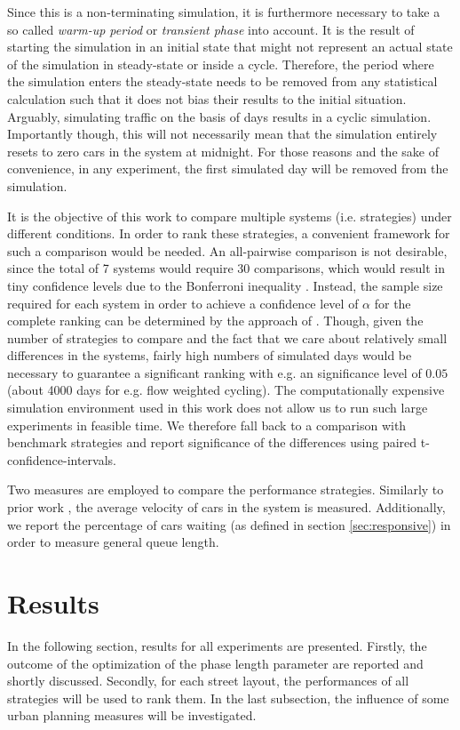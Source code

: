 \documentclass[11pt]{article}
\begin{document}
Since this is a non-terminating simulation, it is furthermore necessary to take a so called \textit{warm-up period} or \textit{transient phase} into account. It is the result of starting the simulation in an initial state that might not represent an actual state of the simulation in steady-state or inside a cycle. Therefore, the period where the simulation enters the steady-state needs to be removed from any statistical calculation such that it does not bias their results to the initial situation. Arguably, simulating traffic on the basis of days results in a cyclic simulation. Importantly though, this will not necessarily mean that the simulation entirely resets to zero cars in the system at midnight. For those reasons and the sake of convenience, in any experiment, the first simulated day will be removed from the simulation. 

It is the objective of this work to compare multiple systems (i.e. strategies) under different conditions. In order to rank these strategies, a convenient framework for such a comparison would be needed. An all-pairwise comparison is not desirable, since the total of 7 systems would require 30 comparisons, which would result in tiny confidence levels due to the Bonferroni inequality \citep[see e.g.][]{law2007simulation}. Instead, the sample size required for each system in order to achieve a confidence level of $\alpha$ for the complete ranking can be determined by the approach of \citet{dudewicz1975allocation}. Though, given the number of strategies to compare and the fact that we care about relatively small differences in the systems, fairly high numbers of simulated days would be necessary to guarantee a significant ranking with e.g. an significance level of $0.05$ (about 4000 days for e.g. flow weighted cycling). The computationally expensive simulation environment used in this work does not allow us to run such large experiments in feasible time. We therefore fall back to a comparison with benchmark strategies and report significance of the differences using paired t-confidence-intervals.

Two measures are employed to compare the performance strategies. Similarly to prior work \citep{srinivasan2006neural}, the average velocity of cars in the system is measured. Additionally, we report the percentage of cars waiting (as defined in section \ref{sec:responsive}) in order to measure general queue length.

\section{Results}
\label{sec:results}
In the following section, results for all experiments are presented. Firstly, the outcome of the optimization of the phase length parameter are reported and shortly discussed. Secondly, for each street layout, the performances of all strategies will be used to rank them. In the last subsection, the influence of some urban planning measures will be investigated.
\end{document}
